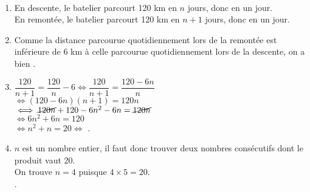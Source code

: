 \ \\ [-5mm]
\begin{enumerate}
   \item En descente, le batelier parcourt 120 km en $n$ jours, donc  en un jour. \\
   En remontée, le batelier parcourt 120 km en $n+1$ jours, donc  en un jour. \\
   \item Comme la distance parcourue quotidiennement lors de la remontée est inférieure de 6 km à celle parcourue quotidiennement lors de la descente, on a bien .
   \item $\dfrac{120}{n+1} =\dfrac{120}{n} - 6 \iff \dfrac{120}{n+1} =\dfrac{120-6n}{n}$ \\ [1mm]
   \hspace*{2.85cm} $\iff (120-6n)(n+1) =120n$ \\
   \hspace*{2.85cm} $\iff \cancel{120n}+120-6n^2-6n =\cancel{120n}$ \\
   \hspace*{2.85cm} $\iff 6n^2+6n =120$ \\
   \hspace*{2.85cm} $\iff n^2+n =20 \iff$ .
   \item $n$ est un nombre entier, il faut donc trouver deux nombres consécutifs dont le produit vaut 20. \\
   On trouve $n =4$ puisque $4\times5 =20$. \\
   .
\end{enumerate}
